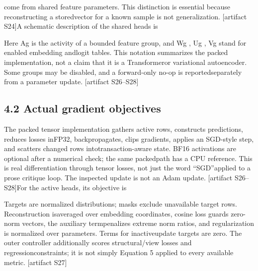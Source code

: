 
\noindent
come from shared feature parameters. This distinction is essential because reconstructing a stored\linebreak[4]
vector for a known sample is not generalization. [artifact S24]\linebreak[4]
A schematic description of the shared heads is\par




\noindent
Here Ag is the activity of a bounded feature group, and Wg , Ug , Vg stand for enabled embedding and\linebreak[4]
logit tables. This notation summarizes the packed implementation, not a claim that it is a Transformer\linebreak[4]
or variational autoencoder. Some groups may be disabled, and a forward-only no-op is reported\linebreak[4]
separately from a parameter update. [artifact S26--S28]\par

\subsection*{4.2  Actual gradient objectives}
\noindent
The packed tensor implementation gathers active rows, constructs predictions, reduces losses in\linebreak[4]
FP32, backpropagates, clips gradients, applies an SGD-style step, and scatters changed rows into\linebreak[4]
transaction-aware state. BF16 activations are optional after a numerical check; the same packed\linebreak[4]
path has a CPU reference. This is real differentiation through tensor losses, not just the word ``SGD''\linebreak[4]
applied to a prose critique loop. The inspected update is not an Adam update. [artifact S26--S28]\linebreak[4]
For the active heads, its objective is\par


\noindent
Targets are normalized distributions; masks exclude unavailable target rows. Reconstruction is\linebreak[4]
averaged over embedding coordinates, cosine loss guards zero-norm vectors, the auxiliary term\linebreak[4]
penalizes extreme norm ratios, and regularization is normalized over parameters. Terms for inactive\linebreak[4]
update targets are zero. The outer controller additionally scores structural/view losses and regression\linebreak[4]
constraints; it is not simply Equation 5 applied to every available metric. [artifact S27]\par

